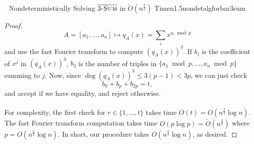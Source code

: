 \begin{theorem}{\Stop\,\,\cite{carmosino2016nseth} Nondeterministically Solving \(\bar{3\textsc{-Sum}}\) in \(\tilde{O}(n^{\frac{3}{2}})\) Time}{n1.5nondetalgforbar3sum}
\begin{proof}
\begin{equation*}
                    A=[a_1,\ldots,a_n]\mapsto q_A(x)=\sum_{i}x^{a_i\bmod p}
                \end{equation*}
                and use the fast Fourier transform to compute \((q_A(x))^3\). If \(b_j\) is the coefficient of \(x^j\) in \((q_A(x))^3\), \(b_3\) is the number of triples in \(\{a_1\bmod p,\ldots,a_n\bmod p\}\) summing to \(j\). Now, since \(\deg (q_A(x))^3\leq 3(p-1)<3p\), we can just check
                \begin{equation*}
                    b_0+b_{p}+b_{2p}=t,
                \end{equation*}
                and accept if we have equality, and reject otherwise.
                \\
                \\
                For complexity, the first check for \(r\in\{1,\ldots,t\}\) takes time \(O(t)=O\left(n^{\frac{3}{2}}\log n\right)\). The fast Fourier transform computation takes time \(O(p\log p)=\tilde{O}\left(n^\frac{3}{2}\right)\) where \(p=O\left(n^{\frac{3}{2}}\log n\right)\). In short, our procedure takes \(O\left(n^{\frac{3}{2}}\log n\right)\), as desired.
            \end{proof}
        \end{theorem}